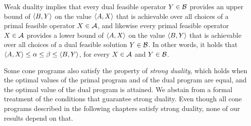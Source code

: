 Weak duality implies that every dual feasible operator $Y \in \mathcal{B}$ provides an
upper bound of $\langle B , Y\rangle$ on the value $\langle A , X\rangle$ that is achievable over all
choices of a primal feasible operator $X \in \mathcal{A}$, and likewise every primal feasible 
operator $X \in \mathcal{A}$ provides a lower bound of $\langle A , X\rangle$ on the value 
$\langle B , Y\rangle$
that is achievable over all choices of a dual feasible solution $Y \in \mathcal{B}$. 
In other words, it holds that
$\langle A , X\rangle \leq \alpha \leq \beta \leq \langle B , Y\rangle$,
for every $X \in \mathcal{A}$ and $Y \in \mathcal{B}$. 

Some cone programs also satisfy 
the property of \emph{strong duality}, which holds when
the optimal values of the primal program and of the dual program are equal, and 
the optimal value of the dual program is attained.
We abstain from a formal treatment of the conditions that guarantee
strong duality. Even though all cone programs described in the following chapters 
satisfy strong duality, none of our results depend on that.
